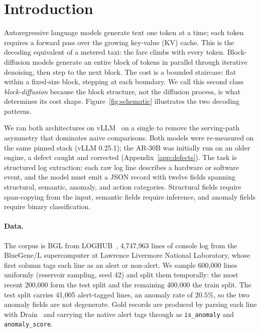 \section{Introduction}
\label{sec:intro}

Autoregressive language models generate text one token at a time;
each token requires a forward pass over the growing key-value (KV)
cache. This is the decoding equivalent of a metered taxi: the fare
climbs with every token. Block-diffusion models generate an entire
block of tokens in
parallel through iterative denoising, then step to the next block.
The cost is a bounded staircase: flat within a fixed-size block,
stepping at each boundary. We call this second class \emph{block-diffusion} because
the block structure, not the diffusion process, is what
determines its cost shape. Figure~\ref{fig:schematic} illustrates
the two decoding patterns.

We ran both architectures on vLLM~\cite{vllm2023} on a single
\gpuModel{} to remove the serving-path asymmetry that dominates naive
comparisons. Both models were re-measured on the same pinned stack
(vLLM 0.25.1); the AR-30B was initially run on an older engine, a
defect caught and corrected (Appendix~\ref{app:defects}). The task is structured log
extraction: each raw log line describes a hardware or software event,
and the model must emit a JSON record with twelve fields spanning
structural, semantic, anomaly, and action categories. Structural
fields require span-copying from the input, semantic fields require
inference, and anomaly fields require binary classification.

\paragraph{Data.}

The corpus is BGL from LOGHUB~\cite{loghub}, 4{,}747{,}963 lines of
console log from the BlueGene/L supercomputer at Lawrence Livermore
National Laboratory, whose first column tags each line as an alert or
non-alert. We sample 600{,}000 lines uniformly (reservoir sampling,
seed 42) and split them temporally: the most recent 200{,}000 form the
test split and the remaining 400{,}000 the train split. The test split
carries 41{,}005 alert-tagged lines, an anomaly rate of $20.5\%$, so
the two anomaly fields are not degenerate. Gold records are produced
by parsing each line with Drain~\cite{drain} and carrying the native
alert tags through as \texttt{is\_anomaly} and \texttt{anomaly\_score}.

